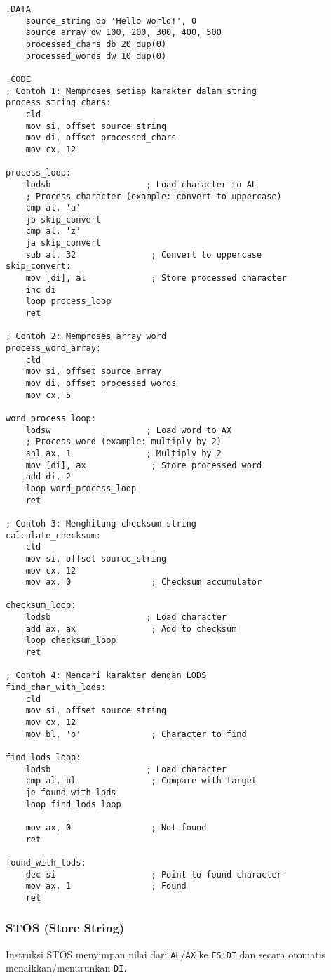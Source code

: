 \documentclass[../main.tex]{subfiles}
\begin{document}
                \begin{lstlisting}[language={[x86masm]Assembler}, caption=Contoh Instruksi LODS, label={lst:lods-examples}]
.DATA
    source_string db 'Hello World!', 0
    source_array dw 100, 200, 300, 400, 500
    processed_chars db 20 dup(0)
    processed_words dw 10 dup(0)

.CODE
; Contoh 1: Memproses setiap karakter dalam string
process_string_chars:
    cld
    mov si, offset source_string
    mov di, offset processed_chars
    mov cx, 12
    
process_loop:
    lodsb                   ; Load character to AL
    ; Process character (example: convert to uppercase)
    cmp al, 'a'
    jb skip_convert
    cmp al, 'z'
    ja skip_convert
    sub al, 32               ; Convert to uppercase
skip_convert:
    mov [di], al             ; Store processed character
    inc di
    loop process_loop
    ret

; Contoh 2: Memproses array word
process_word_array:
    cld
    mov si, offset source_array
    mov di, offset processed_words
    mov cx, 5
    
word_process_loop:
    lodsw                   ; Load word to AX
    ; Process word (example: multiply by 2)
    shl ax, 1               ; Multiply by 2
    mov [di], ax             ; Store processed word
    add di, 2
    loop word_process_loop
    ret

; Contoh 3: Menghitung checksum string
calculate_checksum:
    cld
    mov si, offset source_string
    mov cx, 12
    mov ax, 0                ; Checksum accumulator
    
checksum_loop:
    lodsb                   ; Load character
    add ax, ax               ; Add to checksum
    loop checksum_loop
    ret

; Contoh 4: Mencari karakter dengan LODS
find_char_with_lods:
    cld
    mov si, offset source_string
    mov cx, 12
    mov bl, 'o'              ; Character to find
    
find_lods_loop:
    lodsb                   ; Load character
    cmp al, bl               ; Compare with target
    je found_with_lods
    loop find_lods_loop
    
    mov ax, 0                ; Not found
    ret
    
found_with_lods:
    dec si                   ; Point to found character
    mov ax, 1                ; Found
    ret
                \end{lstlisting}

            \subsubsection{STOS (Store String)}
                Instruksi STOS menyimpan nilai dari \texttt{AL}/\texttt{AX} ke \texttt{ES:DI} dan secara otomatis menaikkan/menurunkan \texttt{DI}.
\end{document}

